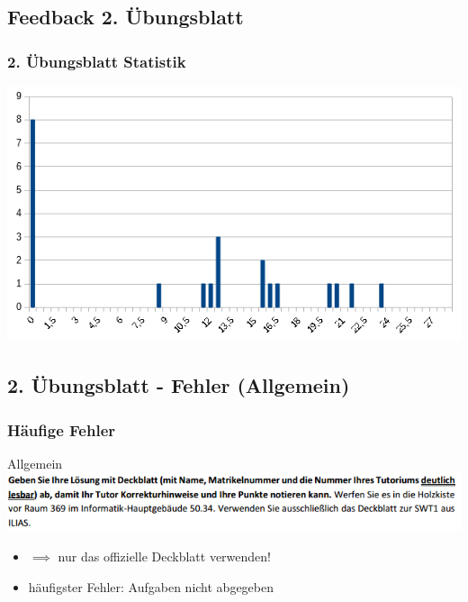 \documentclass[18pt]{beamer}
\begin{document}
\subsection{Feedback 2. Übungsblatt}
\begin{frame}
	\frametitle{2. Übungsblatt Statistik}
	\includegraphics[scale=0.7]{./pics/tut2/statistics-ub2.png}
\end{frame}
	
\subsection{2. Übungsblatt - Fehler (Allgemein)}
\begin{frame}
		\frametitle{Häufige Fehler}
		\begin{block}{Allgemein}
			\includegraphics[scale=0.6]{./pics/tut2/deckblatt.png}
			\begin{itemize}
				\item $\implies$ nur das offizielle Deckblatt verwenden!
				\pause
				\item häufigster Fehler: Aufgaben nicht abgegeben
			\end{itemize}
		\end{block}
\end{frame}
	
\end{document}
